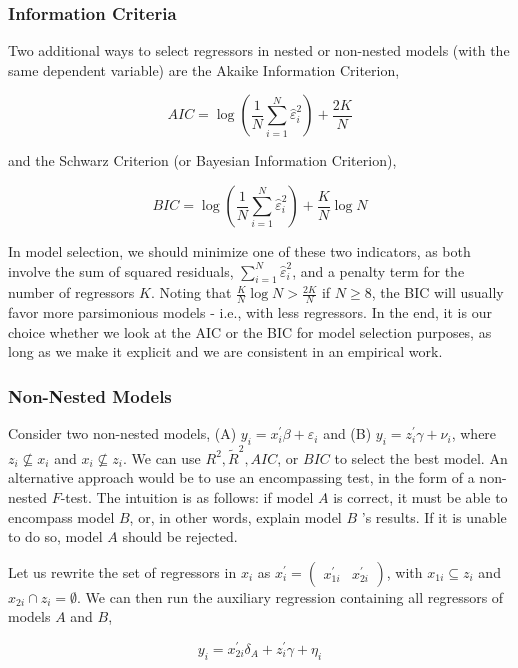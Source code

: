 \subsubsection{Information Criteria}
Two additional ways to select regressors in nested or non-nested models (with the same dependent variable) are the Akaike Information Criterion,

$$
A I C=\log \left(\frac{1}{N} \sum_{i=1}^{N} \widehat{\varepsilon}_{i}^{2}\right)+\frac{2 K}{N}
$$

and the Schwarz Criterion (or Bayesian Information Criterion),

$$
B I C=\log \left(\frac{1}{N} \sum_{i=1}^{N} \widehat{\varepsilon}_{i}^{2}\right)+\frac{K}{N} \log N
$$

In model selection, we should minimize one of these two indicators, as both involve the sum of squared residuals, $\sum_{i=1}^{N} \widehat{\varepsilon}_{i}^{2}$, and a penalty term for the number of regressors $K$. Noting that $\frac{K}{N} \log N>\frac{2 K}{N}$ if $N \geq 8$, the BIC will usually favor more parsimonious models - i.e., with less regressors. In the end, it is our choice whether we look at the AIC or the BIC for model selection purposes, as long as we make it explicit and we are consistent in an empirical work.

\subsubsection{Non-Nested Models}
Consider two non-nested models, (A) $y_{i}=x_{i}^{\prime} \beta+\varepsilon_{i}$ and (B) $y_{i}=z_{i}^{\prime} \gamma+\nu_{i}$, where $z_{i} \nsubseteq x_{i}$ and $x_{i} \nsubseteq z_{i}$. We can use $R^{2}, \tilde{R}^{2}, A I C$, or $B I C$ to select the best model. An alternative approach would be to use an encompassing test, in the form of a non-nested $F$-test. The intuition is as follows: if model $A$ is correct, it must be able to encompass model $B$, or, in other words, explain model $B$ 's results. If it is unable to do so, model $A$ should be rejected.

Let us rewrite the set of regressors in $x_{i}$ as $x_{i}^{\prime}=\left(\begin{array}{cc}x_{1 i}^{\prime} & x_{2 i}^{\prime}\end{array}\right)$, with $x_{1 i} \subseteq z_{i}$ and $x_{2 i} \cap z_{i}=\emptyset$. We can then run the auxiliary regression containing all regressors of models $A$ and $B$,

$$
y_{i}=x_{2 i}^{\prime} \delta_{A}+z_{i}^{\prime} \gamma+\eta_{i}
$$

